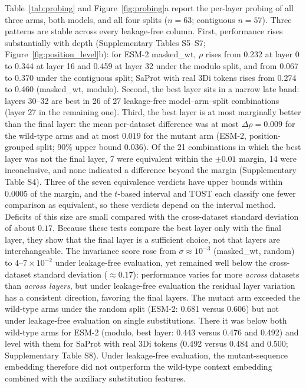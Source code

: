 \documentclass[11pt,a4paper]{article}
\newcommand{\revised}[1]{#1}
\newcommand{\rtwo}[1]{#1}
\newcommand{\rthree}[1]{#1}
\begin{document}
\revised{Table~\ref{tab:probing} and Figure~\ref{fig:probing}a report the \rtwo{per-layer
probing} of all three arms,
both models, and all four splits ($n = 63$; contiguous $n = 57$). \rtwo{Three} patterns are
stable across every leakage-free column. \rtwo{First, performance rises substantially
with depth (Supplementary Tables \rthree{S5--S7}; Figure~\ref{fig:position_level}b): for ESM-2
masked\_wt, $\rho$ rises from 0.232 at layer 0 to 0.344 at layer 16 and 0.459 at layer
32 under the modulo split, and from 0.067 to 0.370 under the contiguous split; SaProt
with real 3Di tokens rises from 0.274 to 0.460 (masked\_wt, modulo).} \rtwo{Second}, the
best layer sits in a narrow late band: layers 30--32 are best in 26 of 27
\rtwo{leakage-free} model--arm--split combinations (layer 27 in the remaining one).
\rtwo{Third, the best layer is at most marginally better than the final layer: \rthree{the mean
per-dataset difference was at most $\Delta\rho = 0.009$ for the wild-type arms and at most
$0.019$ for the mutant arm (ESM-2, position-grouped split; 90\% upper bound $0.036$). Of
the 21 combinations in which the best layer was not the final layer, 7 were equivalent
within the $\pm 0.01$ margin, 14 were inconclusive, and none indicated a difference
beyond the margin (Supplementary Table S4). Three of the seven equivalence verdicts have
upper bounds within $0.0005$ of the margin, and the $t$-based interval and TOST each
classify one fewer comparison as equivalent, so these verdicts depend on the interval
method. Deficits of this size are small compared with the cross-dataset standard
deviation of about $0.17$.} Because these tests compare the best layer only with the
final layer, they show that the final layer is a sufficient choice, not that layers
are interchangeable.} The
invariance score rose from $\sigma \approx 10^{-3}$ (masked\_wt, random) to
$4$--$7 \times 10^{-2}$ under leakage-free evaluation, yet remained well below the
cross-dataset standard deviation ($\approx 0.17$): performance varies far more
\emph{across} datasets than \emph{across layers}, but under leakage-free evaluation
the residual layer variation has a consistent direction, favoring the final layers.
\rthree{The mutant arm exceeded the wild-type arms under the random split (ESM-2:
0.681 versus 0.606) but not under leakage-free evaluation on single substitutions. There
it was below both wild-type arms for ESM-2 (modulo, best layer: 0.443 versus 0.476 and
0.492) and level with them for SaProt with real 3Di tokens (0.492 versus 0.484 and
0.500; Supplementary Table S8). Under leakage-free evaluation, the mutant-sequence
embedding therefore did not outperform the wild-type context embedding combined with
the auxiliary substitution features.}}
\end{document}
